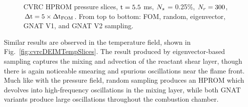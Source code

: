 \begin{figure}
\begin{minipage}{0.99\linewidth}
	\end{minipage}
	\caption{\label{fig:cvrcDEIMPressSlices}CVRC HPROM pressure slices, $\text{t} = 5.5$ ms, $N_s$ = 0.25\%, $N_r = 300$, $\Delta \text{t} = 5 \times \Delta \text{t}_{\text{FOM}}$. From top to bottom: FOM, random, eigenvector, GNAT V1, and GNAT V2 sampling.}
\end{figure}

Similar results are observed in the temperature field, shown in Fig.~\ref{fig:cvrcDEIMTempSlices}. The result produced by eigenvector-based sampling captures the mixing and advection of the reactant shear layer, though there is again noticeable smearing and spurious oscillations near the flame front. Much like with the pressure field, random sampling produces an HPROM which devolves into high-frequency oscillations in the mixing layer, while both GNAT variants produce large oscillations throughout the combustion chamber. 

